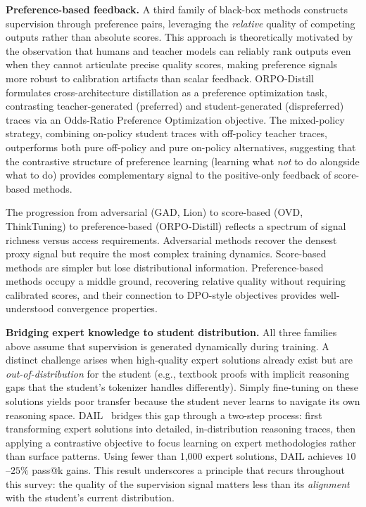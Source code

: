 \documentclass{article} %
\begin{document}
\textbf{Preference-based feedback.}
A third family of black-box methods constructs supervision through preference pairs, leveraging the \emph{relative} quality of competing outputs rather than absolute scores. This approach is theoretically motivated by the observation that humans and teacher models can reliably rank outputs even when they cannot articulate precise quality scores, making preference signals more robust to calibration artifacts than scalar feedback. ORPO-Distill~\citep{2509.25100} formulates cross-architecture distillation as a preference optimization task, contrasting teacher-generated (preferred) and student-generated (dispreferred) traces via an Odds-Ratio Preference Optimization objective. The mixed-policy strategy, combining on-policy student traces with off-policy teacher traces, outperforms both pure off-policy and pure on-policy alternatives, suggesting that the contrastive structure of preference learning (learning what \emph{not} to do alongside what to do) provides complementary signal to the positive-only feedback of score-based methods.

The progression from adversarial (GAD, Lion) to score-based (OVD, ThinkTuning) to preference-based (ORPO-Distill) reflects a spectrum of signal richness versus access requirements. Adversarial methods recover the densest proxy signal but require the most complex training dynamics. Score-based methods are simpler but lose distributional information. Preference-based methods occupy a middle ground, recovering relative quality without requiring calibrated scores, and their connection to DPO-style objectives provides well-understood convergence properties.

\textbf{Bridging expert knowledge to student distribution.}
All three families above assume that supervision is generated dynamically during training. A distinct challenge arises when high-quality expert solutions already exist but are \emph{out-of-distribution} for the student (e.g., textbook proofs with implicit reasoning gaps that the student's tokenizer handles differently). Simply fine-tuning on these solutions yields poor transfer because the student never learns to navigate its own reasoning space. DAIL~\citep{2602.02405} bridges this gap through a two-step process: first transforming expert solutions into detailed, in-distribution reasoning traces, then applying a contrastive objective to focus learning on expert methodologies rather than surface patterns. Using fewer than 1,000 expert solutions, DAIL achieves $10$--$25\%$ pass@k gains. This result underscores a principle that recurs throughout this survey: the quality of the supervision signal matters less than its \emph{alignment} with the student's current distribution.
\end{document}
